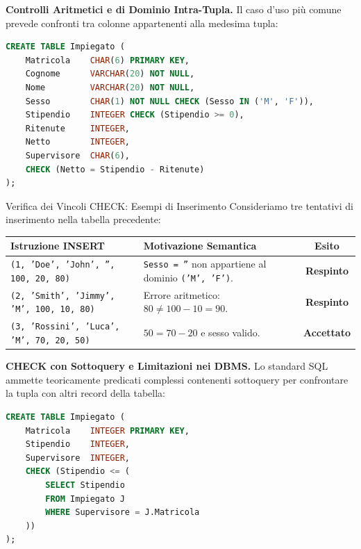 \documentclass[12pt]{extarticle}
\begin{document}
\medskip
\noindent \textbf{Controlli Aritmetici e di Dominio Intra-Tupla.} Il caso d'uso più comune prevede confronti tra colonne appartenenti alla medesima tupla:
\begin{lstlisting}[language=SQL, caption={Vincoli CHECK intra-tupla}]
CREATE TABLE Impiegato (
    Matricola    CHAR(6) PRIMARY KEY,
    Cognome      VARCHAR(20) NOT NULL,
    Nome         VARCHAR(20) NOT NULL,
    Sesso        CHAR(1) NOT NULL CHECK (Sesso IN ('M', 'F')),
    Stipendio    INTEGER CHECK (Stipendio >= 0),
    Ritenute     INTEGER,
    Netto        INTEGER,
    Supervisore  CHAR(6),
    CHECK (Netto = Stipendio - Ritenute)
);
\end{lstlisting}

\begin{cbox}{Verifica dei Vincoli CHECK: Esempi di Inserimento}
\noindent Consideriamo tre tentativi di inserimento nella tabella precedente:
\begin{center}
\small
\begin{tabular}{lp{6.8cm}c}
    \toprule
    \textbf{Istruzione INSERT} & \textbf{Motivazione Semantica} & \textbf{Esito} \\
    \midrule
    \texttt{(1, 'Doe', 'John', '', 100, 20, 80)} & \texttt{Sesso = ''} non appartiene al dominio \texttt{('M', 'F')}. & \textbf{Respinto} \\
    \addlinespace
    \texttt{(2, 'Smith', 'Jimmy', 'M', 100, 10, 80)} & Errore aritmetico: $80 \neq 100 - 10 = 90$. & \textbf{Respinto} \\
    \addlinespace
    \texttt{(3, 'Rossini', 'Luca', 'M', 70, 20, 50)} & $50 = 70 - 20$ e sesso valido. & \textbf{Accettato} \\
    \bottomrule
\end{tabular}
\end{center}
\end{cbox}

\medskip
\noindent \textbf{CHECK con Sottoquery e Limitazioni nei DBMS.} Lo standard SQL ammette teoricamente predicati complessi contenenti sottoquery per confrontare la tupla con altri record della tabella:
\begin{lstlisting}[language=SQL, caption={CHECK con sottoquery (non supportato universalmente)}]
CREATE TABLE Impiegato (
    Matricola    INTEGER PRIMARY KEY,
    Stipendio    INTEGER,
    Supervisore  INTEGER,
    CHECK (Stipendio <= (
        SELECT Stipendio 
        FROM Impiegato J 
        WHERE Supervisore = J.Matricola
    ))
);
\end{lstlisting}
\end{document}
